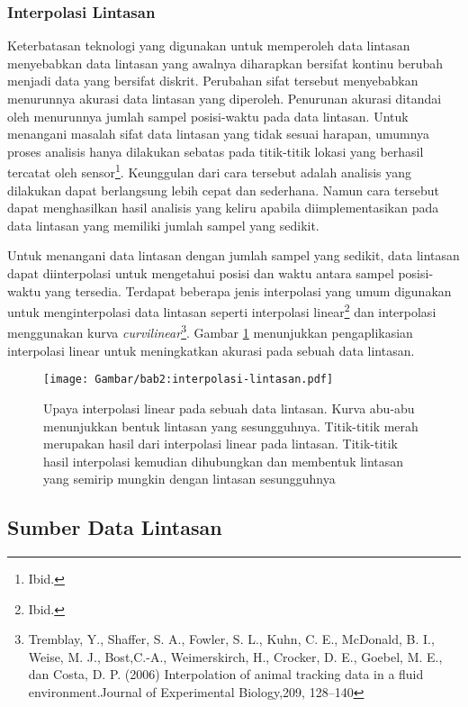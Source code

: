 \documentclass[a4paper,twoside]{article}
\begin{document}
\subsubsection{Interpolasi Lintasan}

Keterbatasan teknologi yang digunakan untuk memperoleh data lintasan menyebabkan data lintasan yang awalnya diharapkan bersifat kontinu berubah menjadi data yang bersifat diskrit. Perubahan sifat tersebut menyebabkan menurunnya akurasi data lintasan yang diperoleh. Penurunan akurasi ditandai oleh menurunnya jumlah sampel posisi-waktu pada data lintasan. Untuk menangani masalah sifat data lintasan yang tidak sesuai harapan, umumnya proses analisis hanya dilakukan sebatas pada titik-titik lokasi yang berhasil tercatat oleh sensor\footnote{Ibid.}. Keunggulan dari cara tersebut adalah analisis yang dilakukan dapat berlangsung lebih cepat dan sederhana. Namun cara tersebut dapat menghasilkan hasil analisis yang keliru apabila diimplementasikan pada data lintasan yang memiliki jumlah sampel yang sedikit.

Untuk menangani data lintasan dengan jumlah sampel yang sedikit, data lintasan dapat diinterpolasi untuk mengetahui posisi dan waktu antara sampel posisi-waktu yang tersedia. Terdapat beberapa jenis interpolasi yang umum digunakan untuk menginterpolasi data lintasan seperti interpolasi linear\footnote{Ibid.} dan interpolasi menggunakan kurva \textit{curvilinear}\footnote{Tremblay, Y., Shaffer, S. A., Fowler, S. L., Kuhn, C. E., McDonald, B. I., Weise, M. J., Bost,C.-A., Weimerskirch, H., Crocker, D. E., Goebel, M. E., dan Costa, D. P. (2006) Interpolation of animal tracking data in a fluid environment.Journal of Experimental Biology,209, 128–140}. Gambar \ref{bab2:interpolasi-lintasan} menunjukkan pengaplikasian interpolasi linear untuk meningkatkan akurasi pada sebuah data lintasan.

\begin{figure}[h]
    \centering
    \texttt{[image: Gambar/bab2:interpolasi-lintasan.pdf]}
    \caption[Interpolasi lintasan]{Upaya interpolasi linear pada sebuah data lintasan. Kurva abu-abu menunjukkan bentuk lintasan yang sesungguhnya. Titik-titik merah merupakan hasil dari interpolasi linear pada lintasan. Titik-titik hasil interpolasi kemudian dihubungkan dan membentuk lintasan yang semirip mungkin dengan lintasan sesungguhnya}
    \label{bab2:interpolasi-lintasan}
\end{figure}

\subsection{Sumber Data Lintasan}
\end{document}
